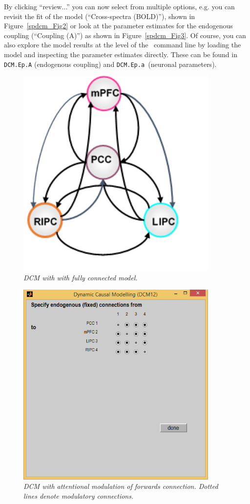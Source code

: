 By clicking ``review...'' you can now select from multiple options, e.g. you can revisit the fit of the model (``Cross-spectra (BOLD)''), shown in Figure~\ref{spdcm_Fig2} or look at the parameter estimates for the endogenous coupling (``Coupling (A)'') as shown in Figure~\ref{spdcm_Fig3}. Of course, you can also explore the model results at the level of the \matlab\ command line by loading the model and inspecting the parameter estimates directly. These can be found in \texttt{DCM.Ep.A} (endogenous coupling) and  \texttt{DCM.Ep.a }(neuronal parameters).

\begin{figure}[ht]
\begin{center}
\includegraphics[width=100mm]{dcm_rs/dcm_mod_full}
\caption{\em DCM with with fully connected model.\label{spdcm_full}}
\end{center}
\end{figure}


\begin{figure}
\begin{center}
\includegraphics[width=100mm]{dcm_rs/Fig1}
\caption{\em DCM with attentional modulation of forwards connection. Dotted lines denote modulatory connections.\label{spdcm_Fig1}}
\end{center}
\end{figure}

